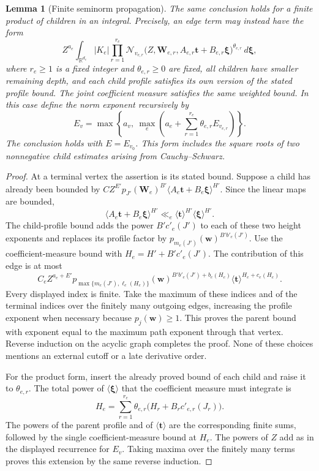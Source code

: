 \documentclass[11pt,a4paper]{article}
\numberwithin{equation}{section}
\numberwithin{figure}{section}
\newtheorem{lemma}[theorem]{Lemma}
\theoremstyle{definition}
\theoremstyle{remark}
\begin{document}
\begin{lemma}[Finite seminorm propagation]
The same conclusion holds for a finite product of children in an integral.
Precisely, an edge term may instead have the form
\[
 Z^{a_e}\int_{\mathbb R^{d_e}}|K_e|
 \prod_{r=1}^{r_e}
 \mathcal N_{v_{e,r}}\bigl(Z,\boldsymbol W_{e,r},
       A_{e,r}\boldsymbol t+B_{e,r}\boldsymbol\xi\bigr)^{\theta_{e,r}}
 \,d\boldsymbol\xi,
\]
where $r_e\ge1$ is a fixed integer and $\theta_{e,r}\ge0$ are fixed, all children have smaller
remaining depth, and each child profile satisfies its own version of the
stated profile bound.  The joint coefficient measure satisfies the same
weighted bound.  In this case define the norm exponent recursively by
\[
 E_v=\max\left\{a_v,\ \max_e
             \left(a_e+\sum_{r=1}^{r_e}\theta_{e,r}E_{v_{e,r}}\right)\right\}.
\]
The conclusion holds with $E=E_{v_0}$.  This form includes the square roots
of two nonnegative child estimates arising from Cauchy--Schwarz.
\end{lemma}

\begin{proof}
At a terminal vertex the assertion is its stated bound.  Suppose a child has
already been bounded by
$C Z^{E'}p_{J'}(\boldsymbol W_e)^{B'}
 \langle A_e\boldsymbol t+B_e\boldsymbol\xi\rangle^{H'}$.
Since the linear maps are bounded,
\[
 \langle A_e\boldsymbol t+B_e\boldsymbol\xi\rangle^{H'}
 \ll_e\langle\boldsymbol t\rangle^{H'}
              \langle\boldsymbol\xi\rangle^{H'}.
\]
The child-profile bound adds the power $B'c'_e(J')$ to each of these two
height exponents and replaces its profile factor by
$p_{m_e(J')}(\boldsymbol w)^{B'b'_e(J')}$.  Use the coefficient-measure
bound with
$H_e=H'+B'c'_e(J')$.  The contribution of this edge is at most
\[
 C_e Z^{a_e+E'}
 p_{\max\{m_e(J'),\ell_e(H_e)\}}(\boldsymbol w)^{B'b'_e(J')+b_e(H_e)}
 \langle\boldsymbol t\rangle^{H_e+c_e(H_e)}.
\]
Every displayed index is finite.  Take the maximum of these indices and of
the terminal indices over the finitely many outgoing edges, increasing the
profile exponent when necessary because $p_j(\boldsymbol w)\ge1$.
This proves the parent bound with exponent equal to the maximum path exponent
through that vertex.  Reverse induction on the acyclic graph completes the
proof.  None of these choices mentions an external cutoff or a late
derivative order.

For the product form, insert the already proved bound of each child and
raise it to $\theta_{e,r}$.  The total power of
$\langle\boldsymbol\xi\rangle$ that the coefficient measure must integrate is
\[
 H_e=\sum_{r=1}^{r_e}\theta_{e,r}
       \bigl(H_r+B_r c'_{e,r}(J_r)\bigr).
\]
The powers of the parent profile and of $\langle\boldsymbol t\rangle$ are
the corresponding finite sums, followed by the single coefficient-measure
bound at $H_e$.  The powers of $Z$ add as in the displayed recurrence for
$E_v$.  Taking maxima over the finitely many terms proves this extension by
the same reverse induction.
\end{proof}
\end{document}
